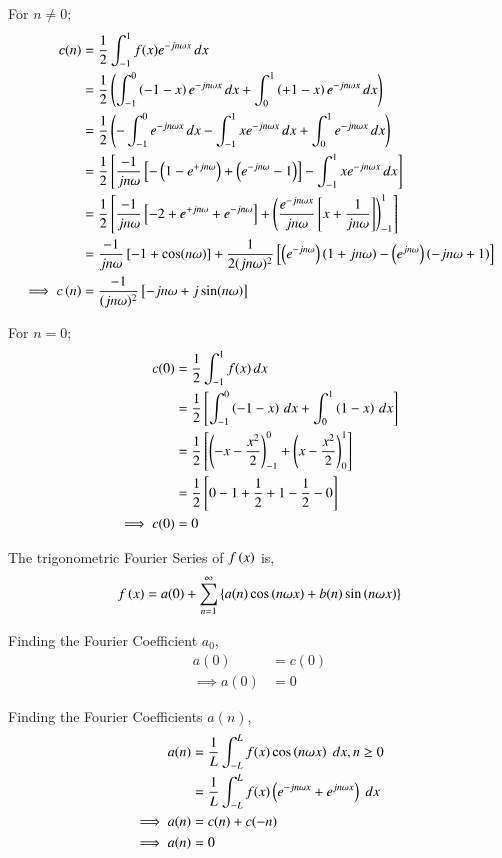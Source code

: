 \documentclass[journal,12pt,onecolumn]{IEEEtran}
\theoremstyle{remark}
\begin{document}
For $n\neq 0$;
\begin{align}
c(n) &= \frac{1}{2} \int_{-1}^{1} f(x) e^{-jn\omega x} \, dx \\
&= \frac{1}{2} \left( \int_{-1}^{0}\left(-1-x\right)e^{-jn\omega x} \, dx +  \int_{0}^{1}\left(+1-x\right)e^{-jn\omega x} \, dx \right) \\
&= \frac{1}{2} \left(-\int_{-1}^{0}e^{-jn\omega x} \, dx -\int_{-1}^{1}xe^{-jn\omega x} \, dx + \int_{0}^{1}e^{-jn\omega x} \, dx\right) \\
&= \frac{1}{2} {}\left[\frac{-1}{jn\omega }{}\left[-\left(1 - e^{+jn\omega }\right) + \left(e^{-jn\omega } -1\right)\right] -\int_{-1}^{1}xe^{-jn\omega x} \, dx\right] \\
&= \frac{1}{2} {}\left[\frac{-1}{jn\omega }{}\left[-2 +e^{+jn\omega } + e^{-jn\omega }\right] +\left(\frac{e^{-jn\omega x}}{jn\omega }{}\left[x + \frac{1}{jn\omega }\right]\right)_{-1}^{1}\right] \\
&= \frac{-1}{jn\omega }{}\left[-1 + \cos(n\omega )\right] + \frac{1}{2(jn\omega )^2}{}\left[\left(e^{-jn\omega }\right)\left(1+jn\omega \right)- \left(e^{jn\omega } \right)\left(-jn\omega +1\right)\right] \\
\implies c\left(n\right)&= \frac{-1}{(jn\omega )^2}{}\left[-jn\omega  + j \sin(n\omega )\right]
\end{align} 

For $n=0$;
\begin{align}
c(0) &= \frac{1}{2} \int_{-1}^{1} f(x) \, dx \\
&=  \frac{1}{2} {}\left[\int_{-1}^{0} \left(-1-x\right) \, dx + \int_{0}^{1} \left(1-x\right) \, dx \right] \\
&= \frac{1}{2} {}\left[ \left(-x-\frac{x^2}{2}\right)_{-1}^{0} + \left(x-\frac{x^2}{2}\right)_{0}^{1}\right] \\
&= \frac{1}{2} {}\left[0-1+\frac{1}{2} +1 -\frac{1}{2} -0\right] \\
\implies c(0)&= 0
\end{align}


The trigonometric Fourier Series of $f\left(x\right)$ is,
\begin{align}
    f\left(x\right)=a(0)+\sum_{n=1}^{\infty}\left\{a(n)\cos\left(n\omega x\right)+b(n)\sin\left(n\omega x\right)\right\}
\end{align}

Finding the Fourier Coefficient $a_0$,
\begin{align}
    a(0)&=c(0)\\
    \implies a(0)&= 0
\end{align}

Finding the Fourier Coefficients $a(n)$,
\begin{align}
    a(n)&=\frac{1}{L}\int_{-L}^{L}f(x)\cos\left(n\omega x\right)\;dx, n \geq 0 \\
    &= \frac{1}{L}\int_{-L}^{L}f(x)\left(e^{-jn\omega x}+e^{jn\omega x}\right) \; dx \\
 \implies a(n)   &= c(n) + c(-n) \\
 \implies a(n)&= 0 \\
\end{align}  
  
\end{document}
